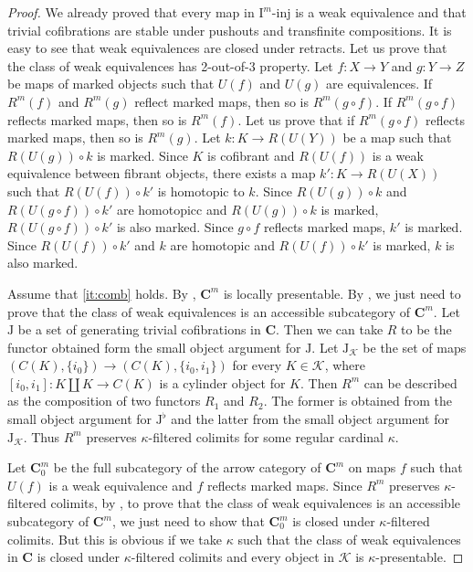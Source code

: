 \documentclass[reqno]{amsart}
\theoremstyle{definition}
\theoremstyle{remark}
\newcommand{\cat}[1]{\mathbf{#1}}
\newcommand{\C}{\cat{C}}
\newcommand{\I}{\mathrm{I}}
\newcommand{\J}{\mathrm{J}}
\newcommand{\class}[2]{#1\text{-}\mathrm{#2}}
\newcommand{\Iinj}[1][\I]{\class{#1}{inj}}
\numberwithin{figure}{section}
\begin{document}
\begin{proof}
We already proved that every map in $\Iinj[\I^m]$ is a weak equivalence and that trivial cofibrations are stable under pushouts and transfinite compositions.
It is easy to see that weak equivalences are closed under retracts.
Let us prove that the class of weak equivalences has 2-out-of-3 property.
Let $f : X \to Y$ and $g : Y \to Z$ be maps of marked objects such that $U(f)$ and $U(g)$ are equivalences.
If $R^m(f)$ and $R^m(g)$ reflect marked maps, then so is $R^m(g \circ f)$.
If $R^m(g \circ f)$ reflects marked maps, then so is $R^m(f)$.
Let us prove that if $R^m(g \circ f)$ reflects marked maps, then so is $R^m(g)$.
Let $k : K \to R(U(Y))$ be a map such that $R(U(g)) \circ k$ is marked.
Since $K$ is cofibrant and $R(U(f))$ is a weak equivalence between fibrant objects,
there exists a map $k' : K \to R(U(X))$ such that $R(U(f)) \circ k'$ is homotopic to $k$.
Since $R(U(g)) \circ k$ and $R(U(g \circ f)) \circ k'$ are homotopicc and $R(U(g)) \circ k$ is marked, $R(U(g \circ f)) \circ k'$ is also marked.
Since $g \circ f$ reflects marked maps, $k'$ is marked.
Since $R(U(f)) \circ k'$ and $k$ are homotopic and $R(U(f)) \circ k'$ is marked, $k$ is also marked.

Assume that \eqref{it:comb} holds.
By , $\C^m$ is locally presentable.
By , we just need to prove that the class of weak equivalences is an accessible subcategory of $\C^m$.
Let $\J$ be a set of generating trivial cofibrations in $\C$.
Then we can take $R$ to be the functor obtained form the small object argument for $\J$.
Let $\J_\mathcal{K}$ be the set of maps $(C(K),\{i_0\}) \to (C(K),\{i_0,i_1\})$ for every $K \in \mathcal{K}$, where $[i_0,i_1] : K \amalg K \to C(K)$ is a cylinder object for $K$.
Then $R^m$ can be described as the composition of two functors $R_1$ and $R_2$.
The former is obtained from the small object argument for $\J^\flat$ and the latter from the small object argument for $\J_\mathcal{K}$.
Thus $R^m$ preserves $\kappa$-filtered colimits for some regular cardinal $\kappa$.

Let $\C^m_0$ be the full subcategory of the arrow category of $\C^m$ on maps $f$ such that $U(f)$ is a weak equivalence and $f$ reflects marked maps.
Since $R^m$ preserves $\kappa$-filtered colimits, by \cite[Corollary~A.2.6.5]{lurie-topos},
to prove that the class of weak equivalences is an accessible subcategory of $\C^m$,
we just need to show that $\C^m_0$ is closed under $\kappa$-filtered colimits.
But this is obvious if we take $\kappa$ such that the class of weak equivalences in $\C$
is closed under $\kappa$-filtered colimits and every object in $\mathcal{K}$ is $\kappa$-presentable.


\end{proof}
\end{document}
